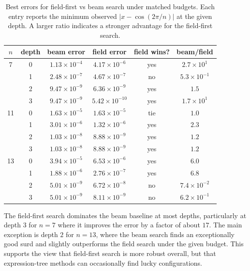\documentclass[11pt]{article}
\begin{document}
\begin{table}[t]
  \centering
  \caption{Best errors for field-first vs beam search under matched budgets.
  Each entry reports the minimum observed $|x - \cos(2\pi/n)|$ at the given depth.
  A larger ratio indicates a stronger advantage for the field-first search.}
  \label{tab:field-vs-beam}
  \begin{tabular}{cccccc}
    \toprule
    $n$ & depth & beam error & field error & field wins? & beam/field \\
    \midrule
    7 & 0 & $1.13{\times}10^{-4}$ & $4.17{\times}10^{-6}$ & yes  & $2.7{\times}10^{1}$ \\
      & 1 & $2.48{\times}10^{-7}$ & $4.67{\times}10^{-7}$ & no   & $5.3{\times}10^{-1}$ \\
      & 2 & $9.47{\times}10^{-9}$ & $6.36{\times}10^{-9}$ & yes  & $1.5$ \\
      & 3 & $9.47{\times}10^{-9}$ & $5.42{\times}10^{-10}$ & yes & $1.7{\times}10^{1}$ \\
    \midrule
    11 & 0 & $1.63{\times}10^{-5}$ & $1.63{\times}10^{-5}$ & tie & $1.0$ \\
       & 1 & $3.01{\times}10^{-6}$ & $1.32{\times}10^{-6}$ & yes & $2.3$ \\
       & 2 & $1.03{\times}10^{-8}$ & $8.88{\times}10^{-9}$ & yes & $1.2$ \\
       & 3 & $1.03{\times}10^{-8}$ & $8.88{\times}10^{-9}$ & yes & $1.2$ \\
    \midrule
    13 & 0 & $3.94{\times}10^{-5}$ & $6.53{\times}10^{-6}$ & yes & $6.0$ \\
       & 1 & $1.88{\times}10^{-6}$ & $2.76{\times}10^{-7}$ & yes & $6.8$ \\
       & 2 & $5.01{\times}10^{-9}$ & $6.72{\times}10^{-8}$ & no  & $7.4{\times}10^{-2}$ \\
       & 3 & $5.01{\times}10^{-9}$ & $8.11{\times}10^{-9}$ & no  & $6.2{\times}10^{-1}$ \\
    \bottomrule
  \end{tabular}
\end{table}

The field-first search dominates the beam baseline at most depths, particularly at depth $3$ for $n=7$ where it improves the error by a factor of about $17$.
The main exception is depth $2$ for $n=13$, where the beam search finds an exceptionally good surd and slightly outperforms the field search under the given budget.
This supports the view that field-first search is more robust overall, but that expression-tree methods can occasionally find lucky configurations.
\end{document}
